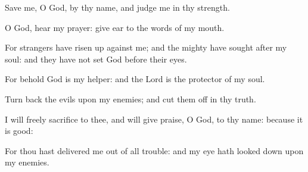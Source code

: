 ﻿\item Save me, O God, by thy name, and judge me in thy strength.
\item O God, hear my prayer: give ear to the words of my mouth.
\item For strangers have risen up against me; and the mighty have sought after my soul: and they have not set God before their eyes.
\item For behold God is my helper: and the Lord is the protector of my soul.
\item Turn back the evils upon my enemies; and cut them off in thy truth.
\item I will freely sacrifice to thee, and will give praise, O God, to thy name: because it is good:
\item For thou hast delivered me out of all trouble: and my eye hath looked down upon my enemies.
